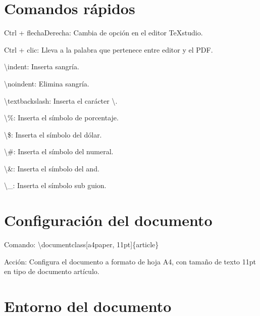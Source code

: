 \documentclass[a4paper, 12pt]{article}
\begin{document}
	\begin{flushleft} \color{colorGris2}
		
		\section{Comandos rápidos}
		
		Ctrl + flechaDerecha: Cambia de opción en el editor TeXstudio.\newline
		
		Ctrl + clic: Lleva a la palabra que pertenece entre editor y el PDF.\newline
		
		\textbackslash indent: Inserta sangría.\newline
		
		\textbackslash noindent: Elimina sangría.\newline
		
		\textbackslash textbackslash: Inserta el carácter \textbackslash.\newline
		
		\textbackslash \%: Inserta el símbolo de porcentaje.\newline
		
		\textbackslash \$: Inserta el símbolo del dólar.\newline
		
		\textbackslash \#: Inserta el símbolo del numeral.\newline
		
		\textbackslash \&: Inserta el símbolo del and.\newline
		
		\textbackslash \_: Inserta el símbolo sub guion.\newline
		
		\section{Configuración del documento}
		
		Comando: \textbackslash documentclass[a4paper, 11pt]\{article\}\newline
			
		Acción: Configura el documento  a formato de hoja A4, con tamaño de texto 11pt en tipo de documento artículo.\newline
			
		\section{Entorno del documento}
			

\end{flushleft}
\end{document}
